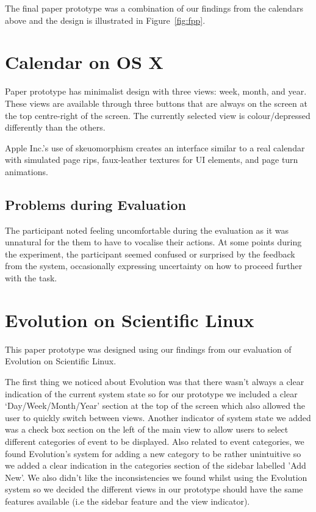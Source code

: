 \documentclass{article}
\begin{document}
The final paper prototype was a combination of our findings from the
calendars above and the design is illustrated in Figure~\ref{fig:fpp}.

\section{Calendar on OS X}

Paper prototype has minimalist design with three views: week, month,
and year. These views are available through three buttons that are
always on the screen at the top centre-right of the screen. The
currently selected view is colour/depressed differently than the
others.

Apple Inc.'s use of skeuomorphism creates an interface similar to a real 
calendar with simulated page rips, faux-leather textures for UI
elements, and page turn animations.

\subsection{Problems during Evaluation}

The participant noted feeling uncomfortable during the evaluation as it
was unnatural for the them to have to vocalise their actions. At some
points during the experiment, the participant seemed confused or
surprised by the feedback from the system, occasionally expressing
uncertainty on how to proceed further with the task.

\section{Evolution on Scientific Linux}

This paper prototype was designed using our findings from our evaluation 
of Evolution on Scientific Linux.

The first thing we noticed about Evolution was that there wasn't always
a clear indication of the current system state so for our prototype we
included a clear `Day/Week/Month/Year' section at the top of the screen
which also allowed the user to quickly switch between views. Another
indicator of system state we added was a check box section on the left of
the main view to allow users to select different categories of event to
be displayed. Also related to event categories, we found Evolution's
system for adding a new category to be rather unintuitive so we added a
clear indication in the categories section of the sidebar labelled
'Add New'. We also didn't like the inconsistencies we found whilst
using the Evolution system so we decided the different views in our
prototype should have the same features available (i.e the sidebar
feature and the view indicator).
\end{document}

